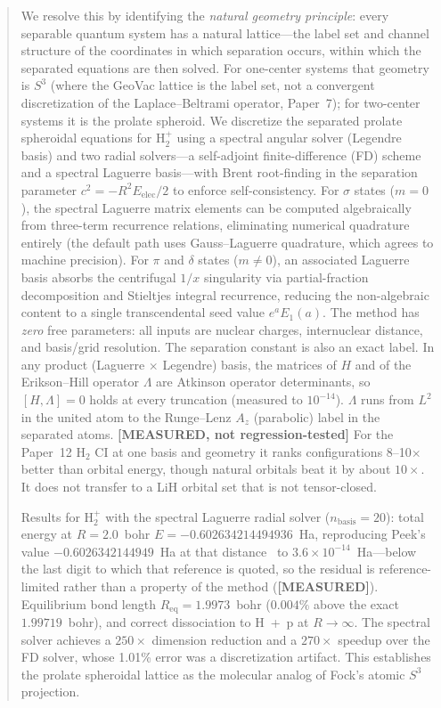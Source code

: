 \documentclass[aps,pra,twocolumn,superscriptaddress,longbibliography]{revtex4-2}
\begin{document}
\begin{abstract}
We resolve this by identifying the \emph{natural geometry principle}:
every separable quantum system has a natural lattice---the label set
and channel structure of the coordinates in which separation occurs,
within which the separated equations are then solved.  For one-center
systems that geometry is $S^3$ (where the GeoVac lattice is the label
set, not a convergent discretization of the Laplace--Beltrami operator,
Paper~7); for two-center systems it is the prolate spheroid.  We
discretize the separated prolate spheroidal equations for H$_2^+$
using a spectral angular solver (Legendre basis) and two radial
solvers---a self-adjoint finite-difference (FD) scheme and a spectral
Laguerre basis---with Brent root-finding in the separation
parameter $c^2 = -R^2 E_{\mathrm{elec}}/2$ to enforce self-consistency.
For $\sigma$ states ($m = 0$), the spectral Laguerre matrix elements
can be computed algebraically from three-term recurrence relations,
eliminating numerical quadrature entirely (the default path uses
Gauss--Laguerre quadrature, which agrees to machine precision).  For $\pi$ and $\delta$
states ($m \neq 0$), an associated Laguerre basis absorbs the
centrifugal $1/x$ singularity via partial-fraction decomposition and
Stieltjes integral recurrence, reducing the non-algebraic content to
a single transcendental seed value $e^a E_1(a)$.
The method has \emph{zero} free parameters: all inputs are nuclear
charges, internuclear distance, and basis/grid resolution.
The separation constant is also an exact label. In any product
(Laguerre $\times$ Legendre) basis, the matrices of $H$ and of the
Erikson--Hill operator $\Lambda$ are Atkinson operator determinants, so
$[H,\Lambda]=0$ holds at every truncation (measured to $10^{-14}$).
$\Lambda$ runs from $L^2$ in the united atom to the Runge--Lenz $A_z$
(parabolic) label in the separated atoms.
\textbf{[MEASURED, not regression-tested]} For the Paper~12 H$_2$ CI at
one basis and geometry it ranks configurations 8--10$\times$ better than
orbital energy, though natural orbitals beat it by about $10\times$. It
does not transfer to a LiH orbital set that is not tensor-closed.

Results for H$_2^+$ with the spectral Laguerre radial solver
($n_{\mathrm{basis}} = 20$): total energy at $R = 2.0$~bohr
$E = -0.602634214494936$~Ha, reproducing Peek's value
$-0.6026342144949$~Ha at that distance~\cite{Peek1965} to
$3.6\times10^{-14}$~Ha---below the last digit to which that
reference is quoted, so the residual is
reference-limited rather than a property of the method
(\textbf{[MEASURED]}).  Equilibrium bond length
$R_{\mathrm{eq}} = 1.9973$~bohr ($0.004\%$ above the exact
$1.99719$~bohr), and correct
dissociation to H~+~p at $R \to \infty$.
The spectral solver achieves a $250\times$ dimension reduction and a
$270\times$ speedup over
the FD solver, whose 1.01\% error was a discretization artifact.
This establishes the prolate spheroidal lattice as the molecular
analog of Fock's atomic $S^3$ projection.
\end{abstract}
\end{document}
